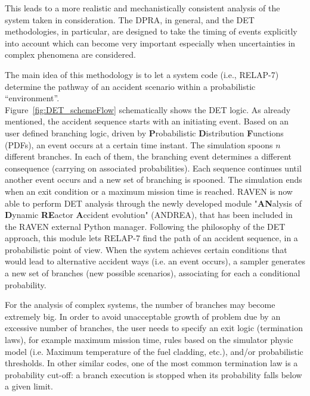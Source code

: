 \documentclass{mc2013}
\begin{document}
This leads to a more realistic and mechanistically consistent analysis of the system taken in consideration. The DPRA, in general, and the DET methodologies, in particular, are designed to take the timing of events explicitly into account which can become very important especially when uncertainties in complex phenomena are considered. 

The main idea of this methodology is to let a system code (i.e., RELAP-7) determine the pathway of an accident scenario within a probabilistic ``environment''. \\ Figure~\ref{fig:DET_schemeFlow} schematically shows the DET logic. As already mentioned, the accident sequence starts with an initiating event. Based on an user defined branching logic, driven by \textbf{P}robabilistic \textbf{D}istribution \textbf{F}unctions (PDFs), an event occurs at a certain time instant. The simulation spoons $n$ different branches. In each of them, the branching event determines a different consequence (carrying on associated probabilities). Each sequence continues until another event occurs and a new set of branching is spooned. The simulation ends when an exit condition or a maximum mission time is reached.    
\label{sec:DETRavenApproach}
RAVEN is now able to perform DET analysis through the newly developed module "\textbf{AN}alysis of \textbf{D}ynamic \textbf{RE}actor \textbf{A}ccident evolution" (ANDREA), that has been included in the RAVEN external Python manager. Following the philosophy of the DET approach, this module lets RELAP-7 find the path of an accident sequence, in a probabilistic point of view. When the system achieves certain conditions that would lead to alternative accident ways (i.e. an event occurs), a sampler generates a new set of branches (new possible scenarios), associating for each a conditional probability.  

For the analysis of complex systems, the number of branches may become extremely big. In order to avoid unacceptable growth of problem due by an excessive number of branches, the user needs to specify an exit logic (termination laws), for example maximum mission time, rules based on the simulator physic model (i.e. Maximum temperature of the fuel cladding, etc.), and/or probabilistic thresholds. In other similar codes, one of the most common termination law is a probability cut-off: a branch execution is stopped when its probability falls below a given limit. 
 
\end{document}
